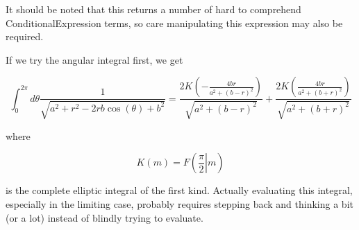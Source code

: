 It should be noted that this returns a number of hard to comprehend ConditionalExpression terms, so care manipulating this expression may also be required.

If we try the angular integral first, we get

\begin{equation}\label{eqn:cylinderPotential:130}
\int_0^{2 \pi } 
d\theta
\frac{1}{\sqrt{a^2+r^2-2 r b \cos (\theta )+b^2}} 
=
\frac{2 K\left(-\frac{4 b r}{a^2+(b-r)^2}\right)}{\sqrt{a^2+(b-r)^2}}+\frac{2 K\left(\frac{4 b r}{a^2+(b+r)^2}\right)}{\sqrt{a^2+(b+r)^2}}
\end{equation}

where

\begin{equation}\label{eqn:cylinderPotential:150}
K(m) = F\left( \left.\frac{\pi }{2}\right| m \right)
\end{equation}

is the complete elliptic integral of the first kind.  Actually evaluating this integral, especially in the limiting case, probably requires stepping back and thinking a bit (or a lot) instead of blindly trying to evaluate.

\EndNoBibArticle
